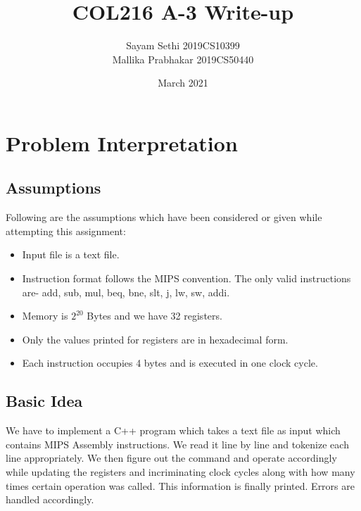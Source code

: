 \documentclass{article}
\title{COL216 A-3 Write-up}
\author{Sayam Sethi 2019CS10399 \\ Mallika Prabhakar 2019CS50440 }
\date{March 2021}
\begin{document}
\maketitle

\section*{Problem Interpretation}
 
\subsection*{Assumptions}
Following are the assumptions which have been considered or given while attempting this assignment: 
\begin{itemize}
    \item Input file is a text file.
    \item Instruction format follows the MIPS convention. The only valid instructions are- add, sub, mul, beq, bne, slt, j, lw, sw, addi.
    \item Memory is $2^{20}$ Bytes and we have 32 registers.
    \item Only the values printed for registers are in hexadecimal form.
    \item Each instruction occupies 4 bytes and is executed in one clock cycle.
    
\end{itemize} 

\subsection*{Basic Idea}
We have to implement a C++ program which takes a text file as input which contains MIPS Assembly instructions. We read it line by line and tokenize each line appropriately. We then figure out the command and operate accordingly while updating the registers and incriminating clock cycles along with how many times certain operation was called. This information is finally printed. Errors are handled accordingly.
\end{document}
